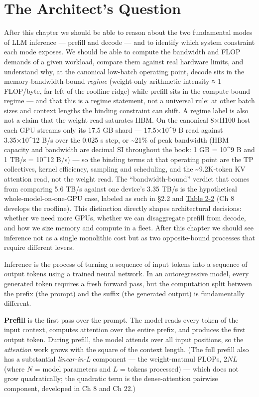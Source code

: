 \section*{The Architect's Question}\label{the-architects-question}

After this chapter we should be able to reason about the two fundamental
modes of LLM inference --- prefill and decode --- and to identify which
system constraint each mode exposes. We should be able to compute the
bandwidth and FLOP demands of a given workload, compare them against
real hardware limits, and understand why, at the canonical low-batch
operating point, decode sits in the memory-bandwidth-bound \emph{regime}
(weight-only arithmetic intensity ≈ 1 FLOP/byte, far left of the
roofline ridge) while prefill sits in the compute-bound regime --- and
that this is a regime statement, not a universal rule: at other batch
sizes and context lengths the binding constraint can shift. A regime
label is also not a claim that the weight read saturates HBM. On the
canonical 8×H100 host each GPU streams only its 17.5 GB shard ---
17.5×10\^{}9 B read against 3.35×10\^{}12 B/s over the 0.025 s step, or
\textasciitilde21\% of peak bandwidth (HBM capacity and bandwidth are
decimal SI throughout the book: 1 GB = 10\^{}9 B and 1 TB/s = 10\^{}12
B/s) --- so the binding terms at that operating point are the TP
collectives, kernel efficiency, sampling and scheduling, and the
\textasciitilde9.2K-token KV attention read, not the weight read. The
``bandwidth-bound'' verdict that comes from comparing 5.6 TB/s against
one device's 3.35 TB/s is the hypothetical whole-model-on-one-GPU case,
labeled as such in §2.2 and \hyperref[tab:2.2]{Table 2-2} (Ch 8 develops the roofline). This
distinction directly shapes architectural decisions: whether we need
more GPUs, whether we can disaggregate prefill from decode, and how we
size memory and compute in a fleet. After this chapter we should see
inference not as a single monolithic cost but as two opposite-bound
processes that require different levers.

\label{concept}


Inference is the process of turning a sequence of input tokens into a
sequence of output tokens using a trained neural network. In an
autoregressive model, every generated token requires a fresh forward
pass, but the computation split between the prefix (the prompt) and the
suffix (the generated output) is fundamentally different.

\textbf{Prefill} is the first pass over the prompt. The model reads
every token of the input context, computes attention over the entire
prefix, and produces the first output token. During prefill, the model
attends over all input positions, so the \emph{attention} work grows
with the square of the context length. (The full prefill also has a
substantial \emph{linear-in-L} component --- the weight-matmul FLOPs,
\(2NL\) (where \(N\) = model parameters and \(L\) = tokens processed)
--- which does not grow quadratically; the quadratic term is the
dense-attention pairwise component, developed in Ch 8 and Ch 22.)

